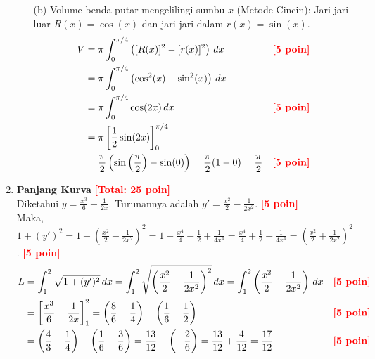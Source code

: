 \documentclass[a4paper,12pt]{article}
\begin{document}
\begin{enumerate}
\begin{enumerate}
          \item[(b)] Volume benda putar mengelilingi sumbu-$x$ (Metode Cincin):
                Jari-jari luar $R(x) = \cos(x)$ dan jari-jari dalam $r(x) = \sin(x)$.
                \begin{align*}
                  V & = \pi \int_{0}^{\pi/4} \left( [R(x)]^2 - [r(x)]^2 \right) \,dx                                                  &  & \text{\textcolor{red}{\textbf{[5 poin]}}} \\
                    & = \pi \int_{0}^{\pi/4} \left( \cos^2(x) - \sin^2(x) \right) \,dx                                                                                               \\
                    & = \pi \int_{0}^{\pi/4} \cos(2x) \,dx                                                                            &  & \text{\textcolor{red}{\textbf{[5 poin]}}} \\
                    & = \pi \left[ \frac{1}{2}\sin(2x) \right]_{0}^{\pi/4}                                                                                                           \\
                    & = \frac{\pi}{2} \left( \sin\left(\frac{\pi}{2}\right) - \sin(0) \right) = \frac{\pi}{2} (1 - 0) = \frac{\pi}{2} &  & \text{\textcolor{red}{\textbf{[5 poin]}}}
                \end{align*}
        \end{enumerate}

  \item \textbf{Panjang Kurva} \hfill \textcolor{red}{\textbf{[Total: 25 poin]}} \\
        Diketahui $y = \frac{x^3}{6} + \frac{1}{2x}$. Turunannya adalah $y' = \frac{x^2}{2} - \frac{1}{2x^2}$. \hfill \textcolor{red}{\textbf{[5 poin]}} \\
        Maka, $1 + (y')^2 = 1 + \left( \frac{x^2}{2} - \frac{1}{2x^2} \right)^2 = 1 + \frac{x^4}{4} - \frac{1}{2} + \frac{1}{4x^4} = \frac{x^4}{4} + \frac{1}{2} + \frac{1}{4x^4} = \left( \frac{x^2}{2} + \frac{1}{2x^2} \right)^2$. \hfill \textcolor{red}{\textbf{[5 poin]}}
        \begin{align*}
          L & = \int_1^2 \sqrt{1 + (y')^2} \,dx = \int_1^2 \sqrt{\left( \frac{x^2}{2} + \frac{1}{2x^2} \right)^2} \,dx = \int_1^2 \left( \frac{x^2}{2} + \frac{1}{2x^2} \right) \,dx             &  & \text{\textcolor{red}{\textbf{[5 poin]}}} \\
            & = \left[ \frac{x^3}{6} - \frac{1}{2x} \right]_1^2 = \left( \frac{8}{6} - \frac{1}{4} \right) - \left( \frac{1}{6} - \frac{1}{2} \right)                                            &  & \text{\textcolor{red}{\textbf{[5 poin]}}} \\
            & = \left( \frac{4}{3} - \frac{1}{4} \right) - \left( \frac{1}{6} - \frac{3}{6} \right) = \frac{13}{12} - \left( -\frac{2}{6} \right) = \frac{13}{12} + \frac{4}{12} = \frac{17}{12} &  & \text{\textcolor{red}{\textbf{[5 poin]}}}
        \end{align*}


\end{enumerate}
\end{document}

